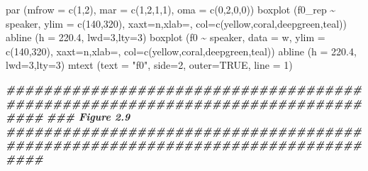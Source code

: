\documentclass[
]{book}
\newenvironment{Shaded}{\begin{snugshade}}{\end{snugshade}}
\newcommand{\AttributeTok}[1]{\textcolor[rgb]{0.77,0.63,0.00}{#1}}
\newcommand{\ConstantTok}[1]{\textcolor[rgb]{0.00,0.00,0.00}{#1}}
\newcommand{\DecValTok}[1]{\textcolor[rgb]{0.00,0.00,0.81}{#1}}
\newcommand{\DocumentationTok}[1]{\textcolor[rgb]{0.56,0.35,0.01}{\textbf{\textit{#1}}}}
\newcommand{\FloatTok}[1]{\textcolor[rgb]{0.00,0.00,0.81}{#1}}
\newcommand{\FunctionTok}[1]{\textcolor[rgb]{0.00,0.00,0.00}{#1}}
\newcommand{\NormalTok}[1]{#1}
\newcommand{\SpecialCharTok}[1]{\textcolor[rgb]{0.00,0.00,0.00}{#1}}
\newcommand{\StringTok}[1]{\textcolor[rgb]{0.31,0.60,0.02}{#1}}
\begin{document}
\begin{Shaded}
\begin{Highlighting}[]
\FunctionTok{par}\NormalTok{ (}\AttributeTok{mfrow =} \FunctionTok{c}\NormalTok{(}\DecValTok{1}\NormalTok{,}\DecValTok{2}\NormalTok{), }\AttributeTok{mar =} \FunctionTok{c}\NormalTok{(}\DecValTok{1}\NormalTok{,}\DecValTok{2}\NormalTok{,}\DecValTok{1}\NormalTok{,}\DecValTok{1}\NormalTok{), }\AttributeTok{oma =} \FunctionTok{c}\NormalTok{(}\DecValTok{0}\NormalTok{,}\DecValTok{2}\NormalTok{,}\DecValTok{0}\NormalTok{,}\DecValTok{0}\NormalTok{))}
\FunctionTok{boxplot}\NormalTok{ (f0\_rep }\SpecialCharTok{\textasciitilde{}}\NormalTok{ speaker, }\AttributeTok{ylim =} \FunctionTok{c}\NormalTok{(}\DecValTok{140}\NormalTok{,}\DecValTok{320}\NormalTok{), }\AttributeTok{xaxt=}\StringTok{\textquotesingle{}n\textquotesingle{}}\NormalTok{,}\AttributeTok{xlab=}\StringTok{\textquotesingle{}\textquotesingle{}}\NormalTok{,}
         \AttributeTok{col=}\FunctionTok{c}\NormalTok{(yellow,coral,deepgreen,teal))}
\FunctionTok{abline}\NormalTok{ (}\AttributeTok{h =} \FloatTok{220.4}\NormalTok{, }\AttributeTok{lwd=}\DecValTok{3}\NormalTok{,}\AttributeTok{lty=}\DecValTok{3}\NormalTok{)}
\FunctionTok{boxplot}\NormalTok{ (f0 }\SpecialCharTok{\textasciitilde{}}\NormalTok{ speaker, }\AttributeTok{data =}\NormalTok{ w, }\AttributeTok{ylim =} \FunctionTok{c}\NormalTok{(}\DecValTok{140}\NormalTok{,}\DecValTok{320}\NormalTok{), }\AttributeTok{xaxt=}\StringTok{\textquotesingle{}n\textquotesingle{}}\NormalTok{,}\AttributeTok{xlab=}\StringTok{\textquotesingle{}\textquotesingle{}}\NormalTok{,}
         \AttributeTok{col=}\FunctionTok{c}\NormalTok{(yellow,coral,deepgreen,teal))}
\FunctionTok{abline}\NormalTok{ (}\AttributeTok{h =} \FloatTok{220.4}\NormalTok{, }\AttributeTok{lwd=}\DecValTok{3}\NormalTok{,}\AttributeTok{lty=}\DecValTok{3}\NormalTok{)}
\FunctionTok{mtext}\NormalTok{ (}\AttributeTok{text =} \StringTok{"f0"}\NormalTok{, }\AttributeTok{side=}\DecValTok{2}\NormalTok{, }\AttributeTok{outer=}\ConstantTok{TRUE}\NormalTok{, }\AttributeTok{line =} \DecValTok{1}\NormalTok{)}

\DocumentationTok{\#\#\#\#\#\#\#\#\#\#\#\#\#\#\#\#\#\#\#\#\#\#\#\#\#\#\#\#\#\#\#\#\#\#\#\#\#\#\#\#\#\#\#\#\#\#\#\#\#\#\#\#\#\#\#\#\#\#\#\#\#\#\#\#\#\#\#\#\#\#\#\#\#\#\#\#\#\#\#\#}
\DocumentationTok{\#\#\# Figure 2.9}
\DocumentationTok{\#\#\#\#\#\#\#\#\#\#\#\#\#\#\#\#\#\#\#\#\#\#\#\#\#\#\#\#\#\#\#\#\#\#\#\#\#\#\#\#\#\#\#\#\#\#\#\#\#\#\#\#\#\#\#\#\#\#\#\#\#\#\#\#\#\#\#\#\#\#\#\#\#\#\#\#\#\#\#\#}


\end{Highlighting}
\end{Shaded}
\end{document}
